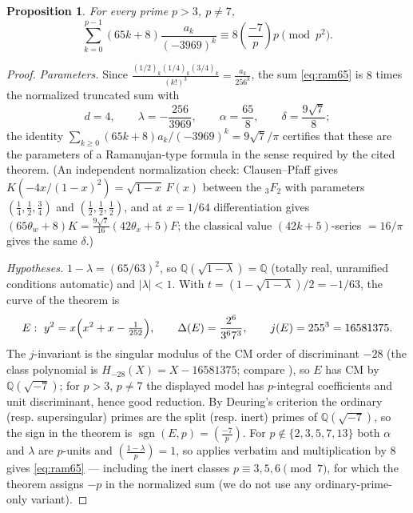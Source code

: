 \documentclass[11pt]{amsart}
\newtheorem{proposition}[theorem]{Proposition}
\theoremstyle{definition}
\theoremstyle{remark}
\newcommand{\Q}{\mathbb{Q}}
\newcommand{\leg}[2]{\left(\frac{#1}{#2}\right)}
\begin{document}
\begin{proposition}\label{prop:ram65}
For every prime $p>3$, $p\ne7$,
\begin{equation}\label{eq:ram65}
\sum_{k=0}^{p-1}(65k+8)\frac{a_k}{(-3969)^k}
\equiv8\leg{-7}{p}p\pmod{p^2}.
\end{equation}
\end{proposition}

\begin{proof}
\emph{Parameters.} Since
$\frac{(1/2)_k(1/4)_k(3/4)_k}{(k!)^3}=\frac{a_k}{256^k}$, the sum
\eqref{eq:ram65} is $8$ times the normalized truncated sum with
\[
d=4,\qquad \lambda=-\frac{256}{3969},\qquad \alpha=\frac{65}{8},
\qquad \delta=\frac{9\sqrt7}{8};
\]
the identity $\sum_{k\ge0}(65k+8)a_k/(-3969)^k=9\sqrt7/\pi$
\cite[Table~2]{Guillera} certifies that these are the parameters of a
Ramanujan-type formula in the sense required by the cited theorem. (An
independent normalization check: Clausen--Pfaff gives
$K(-4x/(1-x)^2)=\sqrt{1-x}\,F(x)$ between the ${}_3F_2$ with parameters
$(\frac14,\frac12,\frac34)$ and $(\frac12,\frac12,\frac12)$, and at
$x=1/64$ differentiation gives
$(65\theta_w+8)K=\frac{9\sqrt7}{16}(42\theta_x+5)F$; the classical
value $(42k+5)$-series $=16/\pi$ \cite[(1.1)]{OZ} gives the same
$\delta$.)

\emph{Hypotheses.} $1-\lambda=(65/63)^2$, so $\Q(\sqrt{1-\lambda})=\Q$
(totally real, unramified conditions automatic) and $|\lambda|<1$.
With $t=(1-\sqrt{1-\lambda})/2=-1/63$, the curve of the theorem is
\[
E:\ y^2=x\Bigl(x^2+x-\tfrac1{252}\Bigr),\qquad
\Delta(E)=\frac{2^6}{3^6 7^3},\qquad j(E)=255^3=16581375.
\]
The $j$-invariant is the singular modulus of the CM order of
discriminant $-28$ (the class polynomial is $H_{-28}(X)=X-16581375$;
compare \cite{LMFDB}), so $E$ has CM by $\Q(\sqrt{-7})$; for $p>3$,
$p\ne7$ the displayed model has $p$-integral coefficients and unit
discriminant, hence good reduction. By Deuring's criterion the ordinary
(resp. supersingular) primes are the split (resp. inert) primes of
$\Q(\sqrt{-7})$, so the sign in the theorem is
$\operatorname{sgn}(E,p)=\leg{-7}{p}$. For $p\notin\{2,3,5,7,13\}$ both
$\alpha$ and $\lambda$ are $p$-units and $\leg{1-\lambda}{p}=1$, so
\cite[Theorem~1]{CDLNS} applies verbatim and multiplication by $8$
gives \eqref{eq:ram65} --- including the inert classes
$p\equiv3,5,6\pmod7$, for which the theorem assigns $-p$ in the
normalized sum (we do not use any ordinary-prime-only variant).


\end{proof}
\end{document}
